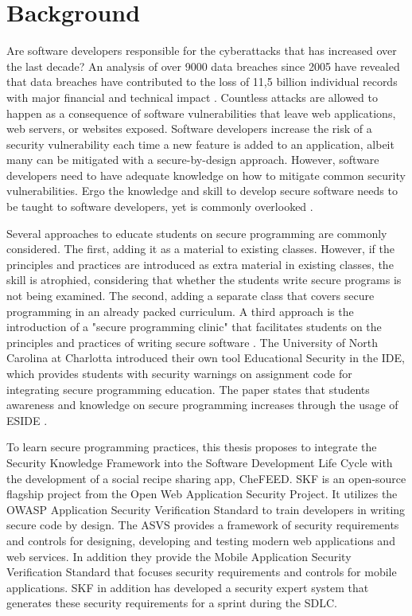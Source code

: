 \section{Background}
Are software developers responsible for the cyberattacks that has increased over the last decade? An analysis of over 9000 data breaches since 2005 have revealed that data breaches have contributed to the loss of 11,5 billion individual records with major financial and technical impact \cite{Hammouchi_2019}. Countless attacks are allowed to happen as a consequence of software vulnerabilities that leave web applications, web servers, or websites exposed. Software developers increase the risk of a security vulnerability each time a new feature is added to an application, albeit many can be mitigated with a secure-by-design approach. However, software developers need to have adequate knowledge on how to mitigate common security vulnerabilities. Ergo the knowledge and skill to develop secure software needs to be taught to software developers, yet is commonly overlooked \cite{Tabassum_2018}.

Several approaches to educate students on secure programming are commonly considered. The first, adding it as a material to existing classes. However, if the principles and practices are introduced as extra material in existing classes, the skill is atrophied, considering that whether the students write secure programs is not being examined. The second, adding a separate class that covers secure programming in an already packed curriculum. A third approach is the introduction of a "secure programming clinic" that facilitates students on the principles and practices of writing secure software \cite{Bishop_2017}. The University of North Carolina at Charlotta introduced their own tool Educational Security in the IDE, which provides students with security warnings on assignment code for integrating secure programming education. The paper states that students awareness and knowledge on secure programming increases through the usage of ESIDE \cite{Tabassum_2018}.

To learn secure programming practices, this thesis proposes to integrate the Security Knowledge Framework into the Software Development Life Cycle with the development of a social recipe sharing app, CheFEED. SKF is an open-source flagship project from the Open Web Application Security Project. It utilizes the OWASP Application Security Verification Standard to train developers in writing secure code by design. The ASVS provides a framework of security requirements and controls for designing, developing and testing modern web applications and web services. In addition they provide the Mobile Application Security Verification Standard that focuses security requirements and controls for mobile applications. SKF in addition has developed a security expert system that generates these security requirements for a sprint during the SDLC.

